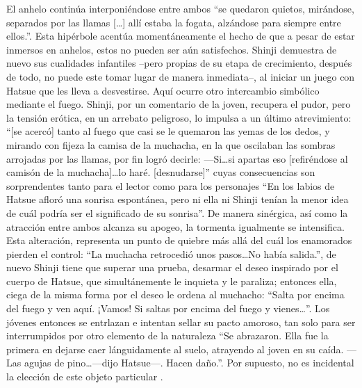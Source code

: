 El anhelo continúa interponiéndose entre ambos ``se quedaron quietos, mirándose, separados por las llamas [\ldots] allí estaba la fogata, alzándose para siempre entre ellos.''.
Esta hipérbole acentúa momentáneamente el hecho de que a pesar de estar inmersos en anhelos, estos no pueden ser aún satisfechos. Shinji demuestra de nuevo sus cualidades infantiles --pero propias de su etapa de crecimiento, después de todo, no puede este tomar lugar de manera inmediata--, al iniciar un juego con Hatsue que les lleva a desvestirse. Aquí ocurre otro intercambio simbólico mediante el fuego.
Shinji, por un comentario de la joven, recupera el pudor, pero la tensión erótica, en un arrebato peligroso, lo impulsa a un último atrevimiento: ``[se acercó] tanto al fuego que casi se le quemaron las yemas de los dedos, y mirando con fijeza la camisa de la muchacha, en la que oscilaban las sombras arrojadas por las llamas, por fin logró decirle:
—Si\ldots si apartas eso [refiréndose al camisón de la muchacha]\ldots lo haré. [desnudarse]'' cuyas consecuencias son sorprendentes tanto para el lector como para los personajes ``En los labios de Hatsue afloró una sonrisa espontánea, pero ni ella ni Shinji tenían la menor idea de cuál podría ser el significado de su sonrisa''. De manera sinérgica, así como la atracción entre ambos alcanza su apogeo, la tormenta igualmente se intensifica. Esta alteración, representa un punto de quiebre más allá del cuál los enamorados pierden el control: ``La muchacha retrocedió unos pasos\ldots No había salida.'', de nuevo Shinji tiene que superar una prueba, desarmar el deseo inspirado por el cuerpo de Hatsue, que simultánemente le inquieta y le paraliza; entonces ella, ciega de la misma forma por el deseo le ordena al muchacho: ``Salta por encima del fuego y ven aquí. ¡Vamos! Si saltas por encima del fuego y vienes\ldots''. Los jóvenes entonces se entrlazan e intentan sellar su pacto amoroso, tan solo para ser interrumpidos por otro elemento de la naturaleza ``Se abrazaron. Ella fue la primera en dejarse caer lánguidamente al suelo, atrayendo al joven en su caída.
—Las agujas de pino\ldots —dijo Hatsue—. Hacen daño.''. Por supuesto, no es incidental la elección de este objeto particular .
